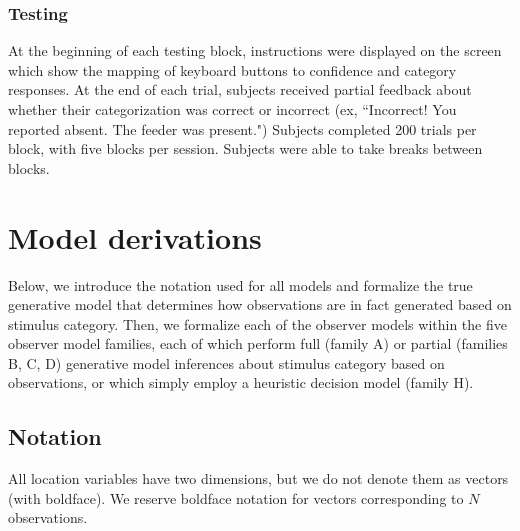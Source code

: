 \documentclass{article}
\begin{document}
\subsubsection*{Testing} At the beginning of each testing block,  instructions were displayed on the screen which show the mapping of keyboard buttons to confidence and category responses. At the end of each trial, subjects received partial feedback about whether their categorization was correct or incorrect (ex, ``Incorrect! You reported absent. The feeder was present.") Subjects completed 200 trials per block, with five blocks per session. Subjects were able to take breaks between blocks. 


\appendix
\section*{Model derivations}

Below, we introduce the notation used for all models and formalize the true generative model that determines how observations are in fact generated based on stimulus category. Then, we formalize each of the observer models within the five observer model families, each of which perform full (family A) or partial (families B, C, D) generative model inferences about stimulus category based on observations, or which simply employ a heuristic decision model (family H).

\subsection*{Notation}
All location variables have two dimensions, but we do not denote them as vectors (with boldface). We reserve boldface notation for vectors corresponding to $N$ observations.\\
\end{document}
